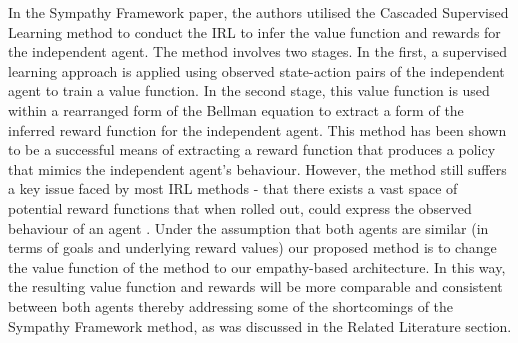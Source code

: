 In the Sympathy Framework paper, the authors utilised the Cascaded Supervised Learning method \cite{cascadedSuperIRL2013} to conduct the IRL to infer the value function and rewards for the independent agent. The method involves two stages. In the first, a supervised learning approach is applied using observed state-action pairs of the independent agent to train a value function. In the second stage, this value function is used within a rearranged form of the Bellman equation \cite{sutton2018reinforcement} to extract a form of the inferred reward function for the independent agent. This method has been shown to be a successful means of extracting a reward function that produces a policy that mimics the independent agent's behaviour. However, the method still suffers a key issue faced by most IRL methods - that there exists a vast space of potential reward functions that when rolled out, could express the observed behaviour of an agent \cite{PolicyInvariance}. 
Under the assumption that both agents are similar (in terms of goals and underlying reward values) our proposed method is to change the value function of the method to our empathy-based architecture. In this way, the resulting value function and rewards will be more comparable and consistent between both agents thereby addressing some of the shortcomings of the Sympathy Framework method, as was discussed in the Related Literature section.  

